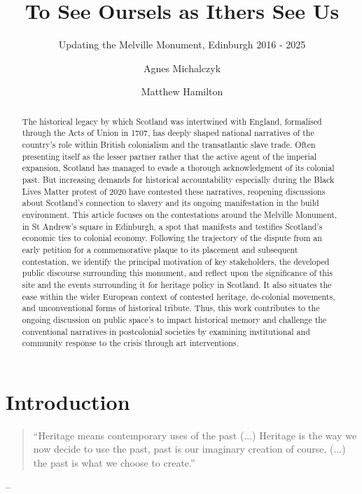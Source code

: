 \documentclass{scrartcl}
\title{To See Oursels as Ithers See Us}
\subtitle{Updating the Melville Monument, Edinburgh 2016 - 2025}
\author[1]{Agnes Michalczyk}
\author[2]{Matthew Hamilton}
\affil[1]{Freie Universität Berlin / University of Edinburgh}
\affil[2]{Università di Bologna / University of Edinburgh}
\date{}
\renewcommand{\cite}{\parencite}
\begin{document}
\maketitle

\begin{abstract}
The historical legacy by which Scotland was intertwined with England, formalised through the Acts of Union in 1707, has deeply shaped national narratives of the country's role within British colonialism and the transatlantic slave trade. Often presenting itself as the lesser partner rather that the active agent of the imperial expansion, Scotland has managed to evade a thorough acknowledgment of its colonial past. But increasing demands for historical accountability especially during the Black Lives Matter protest of 2020 have contested these narratives, reopening discussions about Scotland's connection to slavery and its ongoing manifestation in the build environment. This article focuses on the contestations around the Melville Monument, in St Andrew's square in Edinburgh, a spot that manifests and testifies Scotland's economic ties to colonial economy. Following the trajectory of the dispute from an early petition for a commemorative plaque to its placement and subsequent contestation, we identify the principal motivation of key stakeholders, the developed public discourse surrounding this monument, and reflect upon the significance of this site and the events surrounding it for heritage policy in Scotland. It also situates the ease within the wider European context of contested heritage, de-colonial movements, and unconventional forms of historical tribute. Thus, this work contributes to the ongoing discussion on public space's to impact historical memory and challenge the conventional narratives in postcolonial societies by examining institutional and community response to the crisis through art interventions. 
\end{abstract}

\clearpage

\section{Introduction}

\begin{quotation}
``Heritage means contemporary uses of the past (...) Heritage is the way we now decide to use the past, past is our imaginary creation of course,  (...) the past is what we choose to create.''
\end{quotation}
\begin{flushright}
-- \cite[][]{gregory_ashworth_interview_2008}
\end{flushright}
\end{document}
